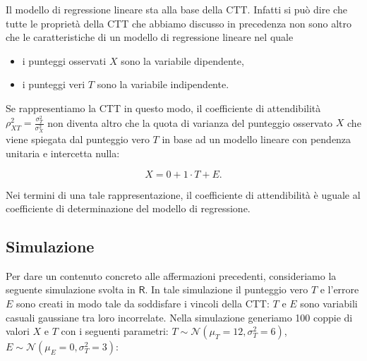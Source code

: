 \documentclass[
  11pt,
]{krantz}
\providecommand{\tightlist}{%
  \setlength{\itemsep}{0pt}\setlength{\parskip}{0pt}}
\theoremstyle{definition}
\theoremstyle{definition}
\theoremstyle{definition}
\theoremstyle{definition}
\theoremstyle{remark}
\begin{document}
Il modello di regressione lineare sta alla base della CTT. Infatti si può dire che tutte le proprietà della CTT che abbiamo discusso in precedenza non sono altro che le caratteristiche di un modello di regressione lineare nel quale

\begin{itemize}
\tightlist
\item
  i punteggi osservati \(X\) sono la variabile dipendente,
\item
  i punteggi veri \(T\) sono la variabile indipendente.
\end{itemize}

Se rappresentiamo la CTT in questo modo, il coefficiente di attendibilità \(\rho_{XT}^2 = \frac{\sigma_{T}^2}{\sigma_X^2}\) non diventa altro che la quota di varianza del punteggio osservato \(X\) che viene spiegata dal punteggio vero \(T\) in base ad un modello lineare con pendenza unitaria e intercetta nulla:

\[
X = 0 + 1 \cdot T + E.
\]

Nei termini di una tale rappresentazione, il coefficiente di attendibilità è uguale al coefficiente di determinazione del modello di regressione.

\hypertarget{simulazione}{%
\subsection{Simulazione}\label{simulazione}}

Per dare un contenuto concreto alle affermazioni precedenti, consideriamo la seguente simulazione svolta in \(\textsf{R}\). In tale simulazione il punteggio vero \(T\) e l'errore \(E\) sono creati in modo tale da soddisfare i vincoli della CTT: \(T\) e \(E\) sono variabili casuali gaussiane tra loro incorrelate. Nella simulazione generiamo 100 coppie di valori \(X\) e \(T\) con i seguenti parametri: \(T \sim \mathcal{N}(\mu_T = 12, \sigma^2_T = 6)\), \(E \sim \mathcal{N}(\mu_E = 0, \sigma^2_T = 3)\):
\end{document}
